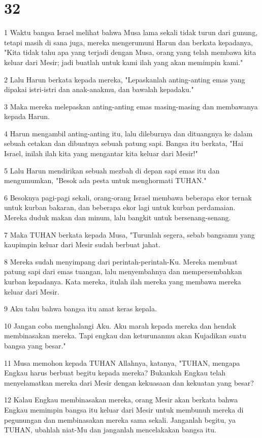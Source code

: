 \chapter{32}

\par 1 Waktu bangsa Israel melihat bahwa Musa lama sekali tidak turun dari gunung, tetapi masih di sana juga, mereka mengerumuni Harun dan berkata kepadanya, "Kita tidak tahu apa yang terjadi dengan Musa, orang yang telah membawa kita keluar dari Mesir; jadi buatlah untuk kami ilah yang akan memimpin kami."
\par 2 Lalu Harun berkata kepada mereka, "Lepaskanlah anting-anting emas yang dipakai istri-istri dan anak-anakmu, dan bawalah kepadaku."
\par 3 Maka mereka melepaskan anting-anting emas masing-masing dan membawanya kepada Harun.
\par 4 Harun mengambil anting-anting itu, lalu dileburnya dan dituangnya ke dalam sebuah cetakan dan dibuatnya sebuah patung sapi. Bangsa itu berkata, "Hai Israel, inilah ilah kita yang mengantar kita keluar dari Mesir!"
\par 5 Lalu Harun mendirikan sebuah mezbah di depan sapi emas itu dan mengumumkan, "Besok ada pesta untuk menghormati TUHAN."
\par 6 Besoknya pagi-pagi sekali, orang-orang Israel membawa beberapa ekor ternak untuk kurban bakaran, dan beberapa ekor lagi untuk kurban perdamaian. Mereka duduk makan dan minum, lalu bangkit untuk bersenang-senang.
\par 7 Maka TUHAN berkata kepada Musa, "Turunlah segera, sebab bangsamu yang kaupimpin keluar dari Mesir sudah berbuat jahat.
\par 8 Mereka sudah menyimpang dari perintah-perintah-Ku. Mereka membuat patung sapi dari emas tuangan, lalu menyembahnya dan mempersembahkan kurban kepadanya. Kata mereka, itulah ilah mereka yang membawa mereka keluar dari Mesir.
\par 9 Aku tahu bahwa bangsa itu amat keras kepala.
\par 10 Jangan coba menghalangi Aku. Aku marah kepada mereka dan hendak membinasakan mereka. Tapi engkau dan keturunanmu akan Kujadikan suatu bangsa yang besar."
\par 11 Musa memohon kepada TUHAN Allahnya, katanya, "TUHAN, mengapa Engkau harus berbuat begitu kepada mereka? Bukankah Engkau telah menyelamatkan mereka dari Mesir dengan kekuasaan dan kekuatan yang besar?
\par 12 Kalau Engkau membinasakan mereka, orang Mesir akan berkata bahwa Engkau memimpin bangsa itu keluar dari Mesir untuk membunuh mereka di pegunungan dan membinasakan mereka sama sekali. Janganlah begitu, ya TUHAN, ubahlah niat-Mu dan janganlah mencelakakan bangsa itu.
